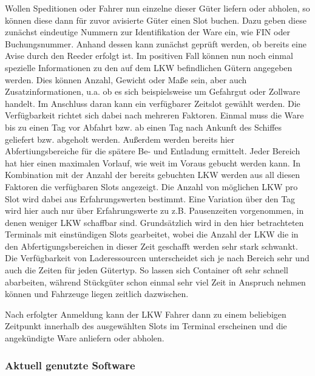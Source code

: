 Wollen Speditionen oder Fahrer nun einzelne dieser Güter liefern oder abholen, so können diese dann für zuvor avisierte Güter einen Slot buchen. Dazu geben diese zunächst eindeutige Nummern zur Identifikation der Ware ein, wie FIN oder Buchungsnummer. Anhand dessen kann zunächst geprüft werden, ob bereits eine Avise durch den Reeder erfolgt ist. Im positiven Fall können nun noch einmal spezielle Informationen zu den auf dem LKW befindlichen Gütern angegeben werden. Dies können Anzahl, Gewicht oder Maße sein, aber auch Zusatzinformationen, u.a. ob es sich beispielsweise um Gefahrgut oder Zollware handelt. Im Anschluss daran kann ein verfügbarer Zeitslot gewählt werden. Die Verfügbarkeit richtet sich dabei nach mehreren Faktoren. Einmal muss die Ware bis zu einen Tag vor Abfahrt bzw. ab einen Tag nach Ankunft des Schiffes geliefert bzw. abgeholt werden. Außerdem werden bereits hier Abfertiungsbereiche für die spätere Be- und Entladung ermittelt. Jeder Bereich hat hier einen maximalen Vorlauf, wie weit im Voraus gebucht werden kann. In Kombination mit der Anzahl der bereits gebuchten LKW werden aus all diesen Faktoren die verfügbaren Slots angezeigt. Die Anzahl von möglichen LKW pro Slot wird dabei aus Erfahrungswerten bestimmt. Eine Variation über den Tag wird hier auch nur über Erfahrungswerte zu z.B. Pausenzeiten vorgenommen, in denen weniger LKW schaffbar sind. Grundsätzlich wird in den hier betrachteten Terminals mit einstündigen Slots gearbeitet, wobei die Anzahl der LKW die in den Abfertigungsbereichen in dieser Zeit geschafft werden sehr stark schwankt. Die Verfügbarkeit von Laderessourcen unterscheidet sich je nach Bereich sehr und auch die Zeiten für jeden Gütertyp. So lassen sich Container oft sehr schnell abarbeiten, während Stückgüter schon einmal sehr viel Zeit in Anspruch nehmen können und Fahrzeuge liegen zeitlich dazwischen.

Nach erfolgter Anmeldung kann der LKW Fahrer dann zu einem beliebigen Zeitpunkt innerhalb des ausgewählten Slots im Terminal erscheinen und die angekündigte Ware anliefern oder abholen.

\subsubsection{Aktuell genutzte Software}



